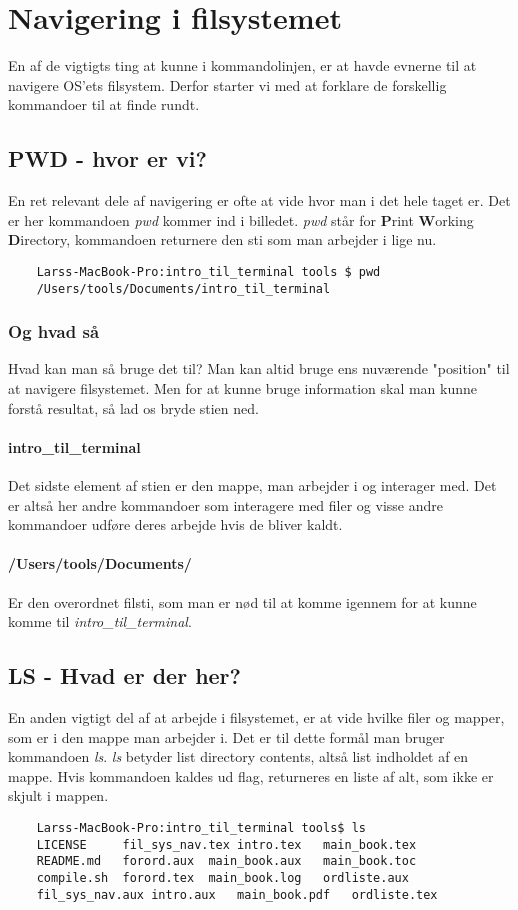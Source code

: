 \chapter{Navigering i filsystemet}
En af de vigtigts ting at kunne i kommandolinjen, er at  havde evnerne til at navigere OS'ets filsystem. Derfor starter vi med at forklare de forskellig kommandoer til at finde rundt.
\section{PWD - hvor er vi?}
En ret relevant dele af navigering er ofte at vide hvor man i det hele taget er. Det er her kommandoen \textit{pwd} kommer ind i billedet. \textit{pwd} står for \textbf{P}rint \textbf{W}orking \textbf{D}irectory, kommandoen returnere den sti som man arbejder i lige nu. 
\begin{lstlisting}
	Larss-MacBook-Pro:intro_til_terminal tools $ pwd
	/Users/tools/Documents/intro_til_terminal
\end{lstlisting}
\subsection*{Og hvad så}
Hvad kan man så bruge det til? Man kan altid bruge ens nuværende "position" til at navigere filsystemet. Men for at kunne bruge information skal man kunne forstå resultat, så lad os bryde stien ned. 
\subsubsection*{intro\_til\_terminal}
Det sidste element af stien er den mappe, man arbejder i og interager med. Det er altså her andre kommandoer som interagere med filer og visse andre kommandoer udføre deres arbejde hvis de bliver kaldt. %
\subsubsection*{/Users/tools/Documents/}
Er den overordnet filsti, som man er nød til at komme igennem for at kunne komme til \textit{intro\_til\_terminal}.

\section{LS - Hvad er der her?}
En anden vigtigt del af at arbejde i filsystemet, er at vide hvilke filer og mapper, som er i den mappe man arbejder i. Det er til dette formål man bruger kommandoen \textit{ls}. \textit{ls} betyder list directory contents, altså list indholdet af en mappe. Hvis kommandoen kaldes ud flag, returneres en liste af alt, som ikke er skjult i mappen.
\begin{lstlisting}
	Larss-MacBook-Pro:intro_til_terminal tools$ ls
	LICENSE		fil_sys_nav.tex	intro.tex	main_book.tex
	README.md	forord.aux	main_book.aux	main_book.toc
	compile.sh	forord.tex	main_book.log	ordliste.aux
	fil_sys_nav.aux	intro.aux	main_book.pdf	ordliste.tex
\end{lstlisting}
